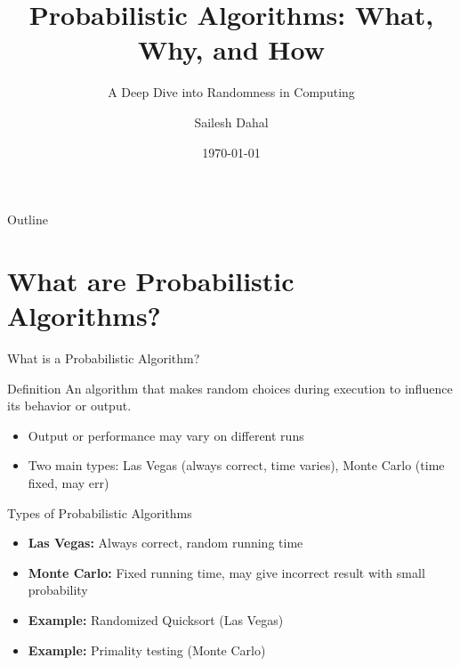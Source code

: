 \documentclass[aspectratio=169]{beamer}
\title{Probabilistic Algorithms: What, Why, and How}
\subtitle{A Deep Dive into Randomness in Computing}
\author{Sailesh Dahal}
\institute{Kathmandu University}
\date{\today}
\begin{document}
\begin{frame}
  \titlepage
\end{frame}

\begin{frame}{Outline}
  \tableofcontents
\end{frame}

\section{What are Probabilistic Algorithms?}
\begin{frame}{What is a Probabilistic Algorithm?}
  \begin{block}{Definition}
    An algorithm that makes random choices during execution to influence its behavior or output.
  \end{block}
  \pause
  \begin{itemize}
    \item Output or performance may vary on different runs
    \item Two main types: Las Vegas (always correct, time varies), Monte Carlo (time fixed, may err)
  \end{itemize}
\end{frame}

\begin{frame}{Types of Probabilistic Algorithms}
  \begin{itemize}
    \item \textbf{Las Vegas:} Always correct, random running time
          \pause
    \item \textbf{Monte Carlo:} Fixed running time, may give incorrect result with small probability
          \pause
    \item \textbf{Example:} Randomized Quicksort (Las Vegas)
          \pause
    \item \textbf{Example:} Primality testing (Monte Carlo)
  \end{itemize}
\end{frame}
\end{document}
